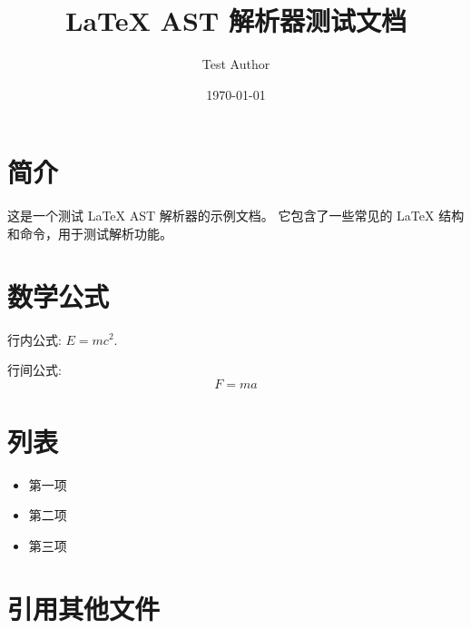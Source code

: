 \documentclass{article}
\begin{document}
\title{LaTeX AST 解析器测试文档}
\author{Test Author}
\date{\today}

\maketitle

\section{简介}

这是一个测试 LaTeX AST 解析器的示例文档。
它包含了一些常见的 LaTeX 结构和命令，用于测试解析功能。

\section{数学公式}

行内公式: $E = mc^2$.

行间公式:
\begin{equation}
    F = ma
\end{equation}

\section{列表}

\begin{itemize}
    \item 第一项
    \item 第二项
    \item 第三项
\end{itemize}

\section{引用其他文件}




\end{document}
